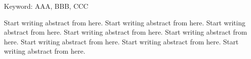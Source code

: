 \begin{EnAbstract}
    \begin{EnAbstractItems}
        \noindent \text Keyword: AAA, BBB, CCC

    \end{EnAbstractItems}

    \begin{EnAbstractDescription}
        Start writing abstract from here. Start writing abstract from here. Start writing abstract from here. Start writing abstract from here. Start writing abstract from here. Start writing abstract from here. Start writing abstract from here. Start writing abstract from here.
    \end{EnAbstractDescription}
    
\end{EnAbstract}

